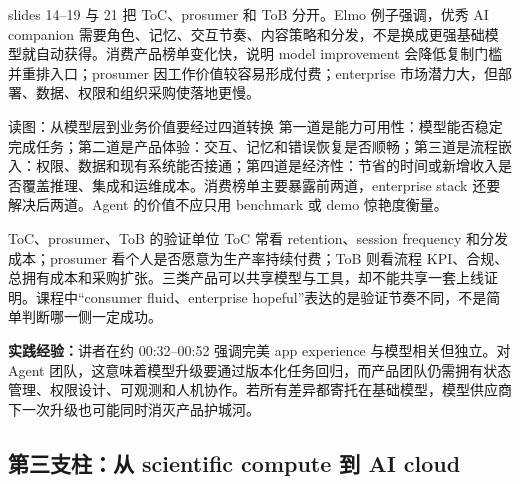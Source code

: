 slides 14--19 与 21 把 ToC、prosumer 和 ToB 分开。Elmo 例子强调，优秀 AI companion 需要角色、记忆、交互节奏、内容策略和分发，不是换成更强基础模型就自动获得。消费产品榜单变化快，说明 model improvement 会降低复制门槛并重排入口；prosumer 因工作价值较容易形成付费；enterprise 市场潜力大，但部署、数据、权限和组织采购使落地更慢。


\begin{knowledgebox}{读图：从模型层到业务价值要经过四道转换}
第一道是能力可用性：模型能否稳定完成任务；第二道是产品体验：交互、记忆和错误恢复是否顺畅；第三道是流程嵌入：权限、数据和现有系统能否接通；第四道是经济性：节省的时间或新增收入是否覆盖推理、集成和运维成本。消费榜单主要暴露前两道，enterprise stack 还要解决后两道。Agent 的价值不应只用 benchmark 或 demo 惊艳度衡量。
\end{knowledgebox}

\begin{importantbox}{ToC、prosumer、ToB 的验证单位}
ToC 常看 retention、session frequency 和分发成本；prosumer 看个人是否愿意为生产率持续付费；ToB 则看流程 KPI、合规、总拥有成本和采购扩张。三类产品可以共享模型与工具，却不能共享一套上线证明。课程中“consumer fluid、enterprise hopeful”表达的是验证节奏不同，不是简单判断哪一侧一定成功。
\end{importantbox}

\textbf{实践经验：}讲者在约 00:32--00:52 强调完美 app experience 与模型相关但独立。对 Agent 团队，这意味着模型升级要通过版本化任务回归，而产品团队仍需拥有状态管理、权限设计、可观测和人机协作。若所有差异都寄托在基础模型，模型供应商下一次升级也可能同时消灭产品护城河。

\subsection{第三支柱：从 scientific compute 到 AI cloud}

